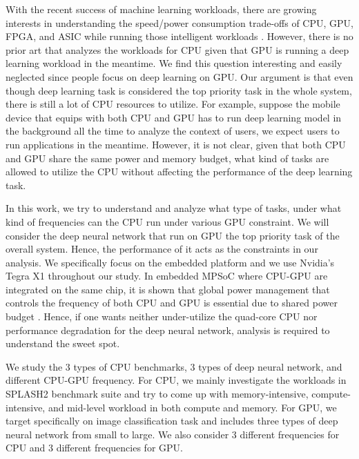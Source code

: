 With the recent success of machine learning workloads, there are growing interests in understanding the speed/power consumption trade-offs of CPU, GPU, FPGA, and ASIC while running those intelligent workloads \cite{malik2016architecture, nurvitadhi2016accelerating}. However, there is no prior art that analyzes the workloads for CPU given that GPU is running a deep learning workload in the meantime. We find this question interesting and easily neglected since people focus on deep learning on GPU. Our argument is that even though deep learning task is considered the top priority task in the whole system, there is still a lot of CPU resources to utilize. For example, suppose the mobile device that equips with both CPU and GPU has to run deep learning model in the background all the time to analyze the context of users, we expect users to run applications in the meantime. However, it is not clear, given that both CPU and GPU share the same power and memory budget, what kind of tasks are allowed to utilize the CPU without affecting the performance of the deep learning task.

In this work, we try to understand and analyze what type of tasks, under what kind of frequencies can the CPU run under various GPU constraint. We will consider the deep neural network that run on GPU the top priority task of the overall system. Hence, the performance of it acts as the constraints in our analysis. We specifically focus on the embedded platform and we use Nvidia's Tegra X1 throughout our study. In embedded MPSoC where CPU-GPU are integrated on the same chip, it is shown that global power management that controls the frequency of both CPU and GPU is essential due to shared power budget \cite{pathania2014integrated}. Hence, if one wants neither under-utilize the quad-core CPU nor performance degradation for the deep neural network, analysis is required to understand the sweet spot.

We study the 3 types of CPU benchmarks, 3 types of deep neural network, and different CPU-GPU frequency. For CPU, we mainly investigate the workloads in SPLASH2 benchmark suite \cite{woo1995splash} and try to come up with memory-intensive, compute-intensive, and mid-level workload in both compute and memory. For GPU, we target specifically on image classification task and includes three types of deep neural network from small to large. We also consider 3 different frequencies for CPU and 3 different frequencies for GPU.
